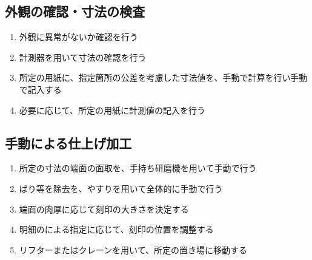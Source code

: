 \subsection{外観の確認・寸法の検査}
\begin{enumerate}
\item {}外観に異常がないか確認を行う
\item {}計測器を用いて寸法の確認を行う
\item 所定の用紙に、指定箇所の公差を考慮した寸法値を、手動で計算を行い手動で記入する
\item 必要に応じて、所定の用紙に計測値の記入を行う
\end{enumerate}


\subsection{手動による仕上げ加工}
\begin{enumerate}
\item 所定の寸法の端面の面取を、手持ち研磨機を用いて手動で行う
\item ばり等を除去を、やすりを用いて全体的に手動で行う
\item {}端面の肉厚に応じて刻印の大きさを決定する
\item 明細のによる指定に応じて、刻印の位置を調整する
\item リフターまたはクレーンを用いて、所定の置き場に移動する
\end{enumerate}

